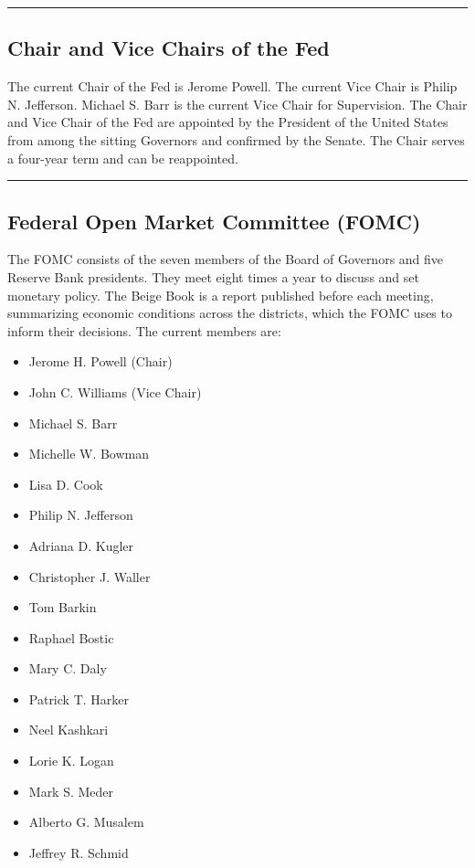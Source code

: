 \documentclass{article}
\begin{document}
\noindent\rule{\linewidth}{0.5pt}

\subsection{Chair and Vice Chairs of the Fed}
The current Chair of the Fed is Jerome Powell. The current Vice Chair is Philip N. Jefferson. Michael S. Barr is the current Vice Chair for Supervision. The Chair and Vice Chair of the Fed are appointed by the President of the United States from among the sitting Governors and confirmed by the Senate. The Chair serves a four-year term and can be reappointed.

\noindent\rule{\linewidth}{0.5pt}

\subsection{Federal Open Market Committee (FOMC)}
The FOMC consists of the seven members of the Board of Governors and five Reserve Bank presidents. They meet eight times a year to discuss and set monetary policy. The Beige Book is a report published before each meeting, summarizing economic conditions across the districts, which the FOMC uses to inform their decisions. The current members are:
\begin{itemize}
    \item Jerome H. Powell (Chair)
    \item John C. Williams (Vice Chair)
    \item Michael S. Barr
    \item Michelle W. Bowman
    \item Lisa D. Cook
    \item Philip N. Jefferson
    \item Adriana D. Kugler
    \item Christopher J. Waller
    \item Tom Barkin
    \item Raphael Bostic
    \item Mary C. Daly
    \item Patrick T. Harker
    \item Neel Kashkari
    \item Lorie K. Logan
    \item Mark S. Meder
    \item Alberto G. Musalem
    \item Jeffrey R. Schmid
\end{itemize}
\end{document}
